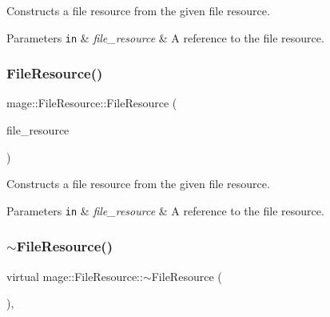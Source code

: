 Constructs a file resource from the given file resource.


\begin{DoxyParams}[1]{Parameters}
\mbox{\tt in}  & {\em file\+\_\+resource} & A reference to the file resource. \\
\hline
\end{DoxyParams}
\hypertarget{classmage_1_1_file_resource_a31bf9e2b425e284e2ed65bf18cd7af7b}{}\label{classmage_1_1_file_resource_a31bf9e2b425e284e2ed65bf18cd7af7b} 
\subsubsection{\texorpdfstring{File\+Resource()}{FileResource()}\hspace{0.1cm}{\footnotesize\ttfamily [3/3]}}
{\footnotesize\ttfamily mage\+::\+File\+Resource\+::\+File\+Resource (\begin{DoxyParamCaption}\item[{\hyperlink{classmage_1_1_file_resource}{File\+Resource} \&\&}]{file\+\_\+resource }\end{DoxyParamCaption})\hspace{0.3cm}{\ttfamily [default]}}

Constructs a file resource from the given file resource.


\begin{DoxyParams}[1]{Parameters}
\mbox{\tt in}  & {\em file\+\_\+resource} & A reference to the file resource. \\
\hline
\end{DoxyParams}
\hypertarget{classmage_1_1_file_resource_a91ed639ff33311ebdfb54c80be7d6f62}{}\label{classmage_1_1_file_resource_a91ed639ff33311ebdfb54c80be7d6f62} 
\subsubsection{\texorpdfstring{$\sim$\+File\+Resource()}{~FileResource()}}
{\footnotesize\ttfamily virtual mage\+::\+File\+Resource\+::$\sim$\+File\+Resource (\begin{DoxyParamCaption}{ }\end{DoxyParamCaption})\hspace{0.3cm}{\ttfamily [virtual]}, {\ttfamily [default]}}

